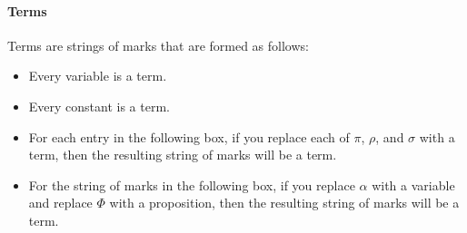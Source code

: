 \documentclass[12pt]{article}
\newcommand{\settext}[2]{\left\{ #1\ |\ \text{#2} \right\}}
\newcommand{\powerset}[1]{\mathcal{P}(#1)}
\newcommand{\dom}[1]{\operatorname{dom}(#1)}
\newcommand{\ran}[1]{\operatorname{ran}(#1)}
\newcommand{\rev}[1]{(#1)^{\dashv}}
\begin{document}
\paragraph{Terms}
Terms are strings of marks that are formed as follows:
\begin{itemize}
\item
Every variable is a term.
\item
Every constant is a term.
\item
For each entry in the following box,
if you replace each of $\pi$, $\rho$, and $\sigma$ with a term, then
the resulting string of marks will be a term.
\begin{center}
\fbox{
\parbox{30em}{
$\{\pi\}$ \sp
$\{\pi,\rho\}$ \sp
$\{\pi,\rho,\sigma\}$ \sp
$(\pi \cup \rho)$ \sp
$(\pi \cap \rho)$ \sp
$(\pi \setminus \rho)$ \sp
$(\pi \circ \rho)$ \sp
$(\pi \times \rho)$ \sp
$(\pi \cdot \rho)$ \sp
$(\pi + \rho)$ \sp
$\powerset{\pi}$ \sp
$\dom{\pi}$ \sp
$\ran{\pi}$ \sp
$\pi(\rho)$ \sp
$\pi[\rho]$ \sp
$\rev{\pi}$ \sp
}
}
\end{center}
\item
For the string of marks in the following box,
if you replace $\alpha$ with a variable and replace $\Phi$ with a proposition, then
the resulting string of marks will be a term.
\begin{center}\fbox{$\settext{\alpha}{$\Phi$}$}\end{center}
\end{itemize}



\def\sp{\hspace{1em}}
\end{document}
